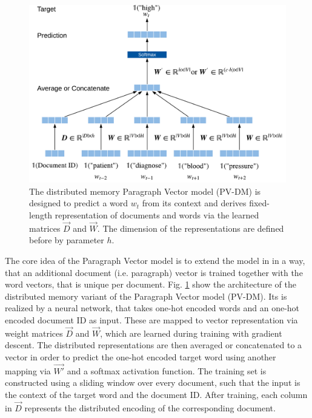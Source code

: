 \begin{figure}[!htbp]
	\centering
	\includegraphics[width=\textwidth]{figures/paragraph-vector}
	\caption[Distributed memory Paragraph Vector model]{The distributed memory Paragraph Vector model (PV-DM) is designed to predict a word $w_t$ from its context and derives fixed-length representation of documents and words via the learned matrices $\vec{D}$ and $\vec{W}$. The dimension of the representations are defined before by parameter $h$.}
	\label{fig:paragraph-vector}
\end{figure}

The core idea of the Paragraph Vector model is to extend the model in \cite{DBLP:journals/jmlr/BengioDVJ03} in a way, that an additional document (i.e. paragraph) vector is trained together with the word vectors, that is unique per document.
Fig. \ref{fig:paragraph-vector} show the architecture of the distributed memory variant of the Paragraph Vector model (PV-DM).
Its is realized by a neural network, that takes one-hot encoded words and an one-hot encoded document ID as input.
These are mapped to vector representation via weight matrices $\vec{D}$ and $\vec{W}$, which are learned during training with gradient descent.
The distributed representations are then averaged or concatenated to a vector in order to predict the one-hot encoded target word using another mapping via $\vec{W'}$ and a softmax activation function.
The training set is constructed using a sliding window over every document, such that the input is the context of the target word and the document ID.
After training, each column in $\vec{D}$ represents the distributed encoding of the corresponding document.

